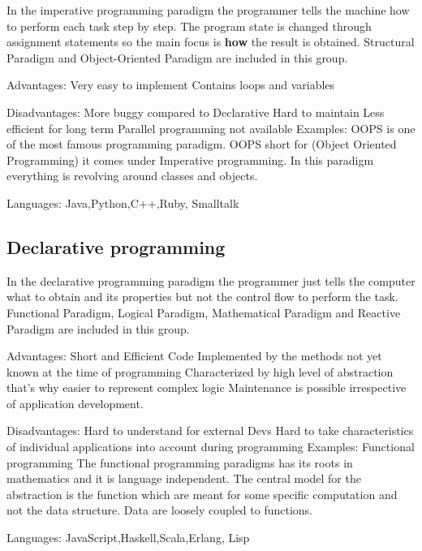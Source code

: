 In the imperative programming paradigm the programmer tells the machine how to perform each task step by step. 
The program state is changed through assignment statements so the main focus is \textbf{how} the result is obtained. 
Structural Paradigm and Object-Oriented Paradigm are included in this group. 

Advantages:
Very easy to implement
Contains loops and variables

Disadvantages:
More buggy compared to Declarative
Hard to maintain
Less efficient for long term
Parallel programming not available
Examples:
OOPS is one of the most famous programming paradigm. OOPS short for (Object Oriented Programming) it comes under Imperative programming. In 
this paradigm everything is revolving around classes and objects.

Languages: Java,Python,C++,Ruby, Smalltalk


        \subsection*{Declarative programming}

In the declarative programming paradigm the programmer just tells the computer what to obtain and its properties but not the control flow to perform the task.
Functional Paradigm, Logical Paradigm, Mathematical Paradigm and Reactive Paradigm are included in this group.
 
Advantages:
Short and Efficient Code
Implemented by the methods not yet known at the time of programming
Characterized by high level of abstraction that's why easier to represent complex logic
Maintenance is possible irrespective of application development.

Disadvantages:
Hard to understand for external Devs
Hard to take characteristics of individual applications into account during programming
Examples:
Functional programming The functional programming paradigms has its roots in mathematics and it is language independent. The central model 
for the abstraction is the function which are meant for some specific computation and not the data structure. Data are loosely coupled to 
functions.

Languages: JavaScript,Haskell,Scala,Erlang, Lisp
 
 
 
 
 
 
 
